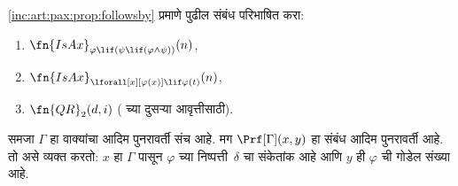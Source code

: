 \begin{prob}
\ref{inc:art:pax:prop:followsby} प्रमाणे पुढील संबंध
परिभाषित करा:
\begin{enumerate}
\item $\fn{IsAx}_{\varphi \lif (\psi \lif (\varphi \land \psi))}(n)$,
\item $\fn{IsAx}_{\lforall[x][\varphi(x)] \lif \varphi(t)}(n)$,
\item $\fn{QR}_{2}(d, i)$ (\QR{} च्या दुसऱ्या आवृत्तीसाठी).
\end{enumerate}
\end{prob}

\begin{prop}
समजा $\Gamma$ हा वाक्यांचा आदिम पुनरावर्ती संच आहे.
मग $\Prf[\Gamma](x, y)$ हा संबंध आदिम पुनरावर्ती आहे.
तो असे व्यक्त करतो: $x$ हा $\Gamma$ पासून $\varphi$ च्या
निष्पत्ती~$\delta$ चा संकेतांक आहे आणि $y$ ही
$\varphi$ ची गोडेल संख्या आहे.
\end{prop}

